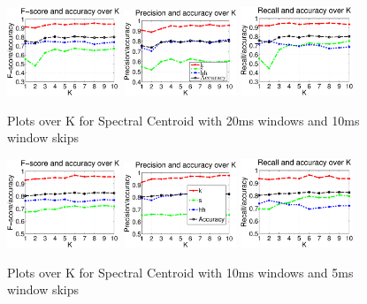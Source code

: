 \begin{figure}


	\centering\includegraphics[width=0.3\textwidth]{tex/appendices/test/scentroid2010FP.png}
	\centering\includegraphics[width=0.3\textwidth]{tex/appendices/test/scentroid2010_P.png}
	\centering\includegraphics[width=0.3\textwidth]{tex/appendices/test/scentroid2010_R.png}
	
	\caption{Plots over K for Spectral Centroid with 20ms windows and 10ms window skips}
\end{figure}
\begin{figure}


	\centering\includegraphics[width=0.3\textwidth]{tex/appendices/test/scentroid105FP.png}
	\centering\includegraphics[width=0.3\textwidth]{tex/appendices/test/scentroid105_P.png}
	\centering\includegraphics[width=0.3\textwidth]{tex/appendices/test/scentroid105_R.png}
		
		\caption{Plots over K for Spectral Centroid with 10ms windows and 5ms window skips}
\end{figure}
